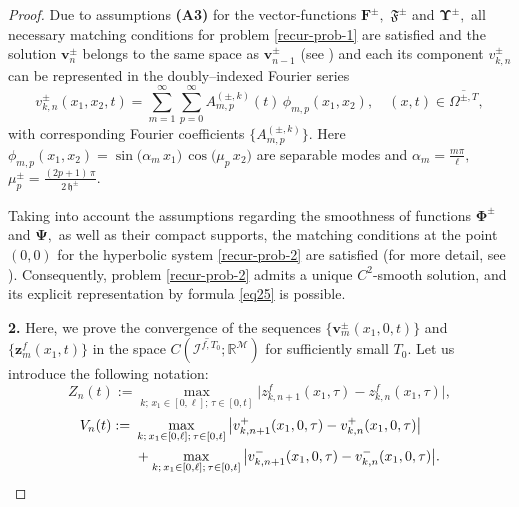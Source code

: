 \documentclass[reqno]{amsart}            %
\numberwithin{equation}{section}
\begin{document}
\begin{proof}
		Due to assumptions \textbf{(A3)} for  the vector-functions $\mathbf{F}^{\pm},$ $\boldsymbol{\mathfrak{F}}^\pm$ and $\boldsymbol{\Upsilon}^\pm,$ all necessary matching conditions for problem \eqref{recur-prob-1} are satisfied and the solution $\mathbf{v}^\pm_n$ belongs to the same space as $\mathbf{v}^\pm_{n-1}$ (see \cite[Chapt. IV, \S 5]{Lad_Sol_Ura_1968}) and each its component ${v}^\pm_{k, n}$
		can be represented in the doubly–indexed Fourier series
		\begin{equation}\label{rep-1}
			{v}^\pm_{k, n}(x_{1},x_{2},t) = \sum_{m=1}^{\infty}\sum_{p=0}^{\infty}
			A^{(\pm, k)}_{m,p}(t)\,\phi_{m,p}(x_{1},x_{2}), \quad (x,t) \in \overline{\Omega^{\pm, T}},
		\end{equation}
		with corresponding Fourier coefficients $\{A^{(\pm, k)}_{m,p}\}.$ Here 
		$
		\phi_{m,p}(x_{1},x_{2}) 
		= \sin\bigl(\alpha_{m}\,x_{1}\bigr)\, \cos\bigl(\mu_{p}\,x_{2}\bigr)
		$
		are separable modes and $\alpha_{m} = \frac{m\pi}{\ell},$  
		\ 
		$
		\mu^{\pm}_{p} = \frac{(2p+1)\,\pi}{2\,\mathfrak{h}^{\pm}}.
		$
		
		
		
		Taking into account the assumptions regarding the smoothness of functions $\boldsymbol{\Phi}^{\pm}$ and $\boldsymbol{\Psi},$ as well as their compact supports, the matching conditions at the point $(0,0)$ for the hyperbolic system \eqref{recur-prob-2} are satisfied (for more detail, see \cite[Appendix B]{Mel-Roh_JMAA-2024}). Consequently, problem \eqref{recur-prob-2} admits a unique $C^2$-smooth solution, and its explicit representation by formula \eqref{eq25} is possible.
		
		\smallskip
		\noindent
		{\bf 2.} Here, we prove the convergence of the sequences 
		$\{\mathbf{v}^\pm_m(x_1, 0, t)\}$ and $\{\mathbf{z}^f_m(x_1,t)\}$
		in the space $C(\overline{\mathcal{I}^{f, T_0}}; \mathbb{R}^\mathcal{M})$ for sufficiently small $T_0.$ Let us introduce the following notation:
		\begin{equation}\label{not-1}
			Z_n(t) := \max_{k;\, x_1\in [0,\ell];\, \tau\in [0, t]} \big|z^f_{k, n+1}(x_1, \tau) - z^f_{k, n}(x_1, \tau)\big|,
		\end{equation}
		\begin{align}\label{not-2}
			V_n(t) := & \ \max_{k; \,x_1\in [0,\ell]; \, \tau\in [0, t]} \big|v^+_{k, n+1}(x_1, 0, \tau) - v^+_{k, n}(x_1, 0, \tau)\big|
			\notag
			\\
			& \ +
			\max_{k;\, x_1\in [0,\ell]; \, \tau\in [0, t]} \big|v^-_{k, n+1}(x_1, 0, \tau) - v^-_{k, n}(x_1, 0, \tau)\big|.
		\end{align}
		

\end{proof}
\end{document}
